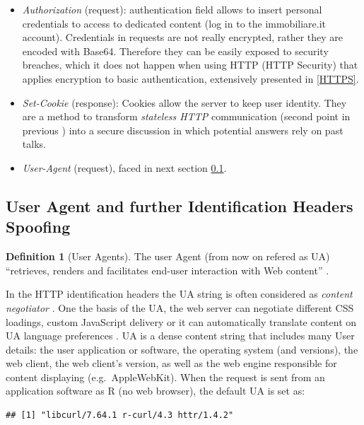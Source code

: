 \documentclass[
  12pt,
  a4paper,
  oneside]{book}
\providecommand{\tightlist}{%
  \setlength{\itemsep}{0pt}\setlength{\parskip}{0pt}}
\theoremstyle{definition}
\newtheorem{definition}{Definition}[chapter]
\theoremstyle{definition}
\theoremstyle{definition}
\theoremstyle{remark}
\begin{document}
\begin{itemize}
\tightlist
\item
  \emph{Authorization} (request): authentication field allows to insert personal credentials to access to dedicated content (log in to the immobiliare.it account). Credentials in requests are not really encrypted, rather they are encoded with Base64. Therefore they can be easily exposed to security breaches, which it does not happen when using HTTP (HTTP Security) that applies encryption to basic authentication, extensively presented in \ref{HTTPS}.
\item
  \emph{Set-Cookie} (response): Cookies allow the server to keep user identity. They are a method to transform \emph{stateless HTTP} communication (second point in previous ) into a secure discussion in which potential answers rely on past talks.
\item
  \emph{User-Agent} (request), faced in next section \ref{spoofing}.
\end{itemize}

\hypertarget{spoofing}{%
\subsection{User Agent and further Identification Headers Spoofing}\label{spoofing}}

\begin{definition}[User Agents]
\protect\hypertarget{def:useragents}{}{\label{def:useragents} {} }The user Agent (from now on refered as UA) ``retrieves, renders and facilitates end-user interaction with Web content'' \citep{UaDef}.
\end{definition}

In the HTTP identification headers the UA string is often considered as \emph{content negotiator} \citep{wiki:UserAgent}. One the basis of the UA, the web server can negotiate different CSS loadings, custom JavaScript delivery or it can automatically translate content on UA language preferences \citep{whoishostingthis.com}.
UA is a dense content string that includes many User details: the user application or software, the operating system (and versions), the web client, the web client's version, as well as the web engine responsible for content displaying (e.g.~AppleWebKit). When the request is sent from an application software as R (no web browser), the default UA is set as:

\begin{lstlisting}
## [1] "libcurl/7.64.1 r-curl/4.3 httr/1.4.2"
\end{lstlisting}
\end{document}

